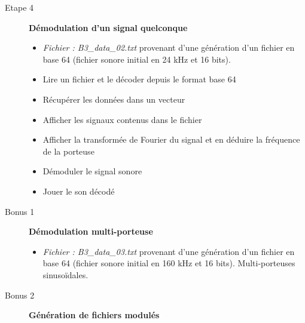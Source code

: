 \documentclass[10pt]{article} %
\begin{document}
\begin{description}
	\item[Etape 4] \textbf{Démodulation d'un signal quelconque} 
	\begin{itemize}
		\item \textit{Fichier : B3\_data\_02.txt} provenant d'une génération d'un fichier en base 64 (fichier sonore initial en 24 kHz et 16 bits).
		\item Lire un fichier et le décoder depuis le format base 64
		\item Récupérer les données dans un vecteur
		\item Afficher les signaux contenus dans le fichier
		\item Afficher la transformée de Fourier du signal et en déduire la fréquence de la porteuse
		\item Démoduler le signal sonore
		\item Jouer le son décodé	
	\end{itemize}	
	
\qquad
	
	\item[Bonus 1] \textbf{Démodulation multi-porteuse}
	\begin{itemize}
		\item \textit{Fichier : B3\_data\_03.txt} provenant d'une génération d'un fichier en base 64 (fichier sonore initial en 160 kHz et 16 bits). Multi-porteuses sinusoïdales.
	\end{itemize}
	
	\item[Bonus 2] \textbf{Génération de fichiers modulés}
	
\end{description}

\newpage

\hypertarget{stepbystep}{}
\end{document}
